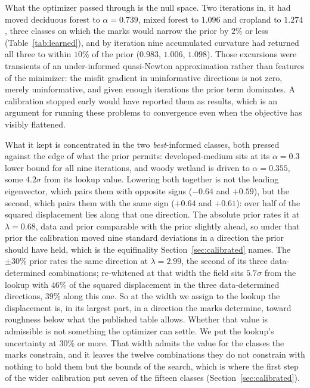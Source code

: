 \documentclass[11pt]{article}
\begin{document}
What the optimizer passed through is the null space. Two iterations
in, it had moved deciduous forest to $\alpha = 0.739$, mixed forest to
$1.096$ and cropland to $1.274$, three classes on which the marks
would narrow the prior by $2\%$ or less (Table~\ref{tab:learned}), and by
iteration nine accumulated curvature had returned all three to within
$10\%$ of the prior ($0.983$, $1.006$, $1.098$). Those excursions
were transients of an under-informed
quasi-Newton approximation rather than features of the minimizer: the
misfit gradient in uninformative directions is not zero, merely
uninformative, and given enough iterations the prior term dominates. A
calibration stopped early would have reported them as results, which is
an argument for running these problems to convergence even when the
objective has visibly flattened.

What it kept is concentrated in the two \emph{best}-informed classes,
both pressed against the edge of what the prior permits:
developed-medium sits at its $\alpha = 0.3$ lower bound for all nine
iterations, and woody wetland is driven to $\alpha = 0.355$, some
$4.2\sigma$ from its lookup value. Lowering both together is not the
leading eigenvector, which pairs them with opposite signs ($-0.64$ and
$+0.59$), but the second, which pairs them with the same sign ($+0.64$
and $+0.61$): over half of the squared displacement lies along that one
direction. The absolute prior rates it at $\lambda = 0.68$, data and
prior comparable with the prior slightly ahead, so under that prior
the calibration moved nine standard deviations in a direction the
prior should have held, which is the equifinality
Section~\ref{sec:calibrated} names. The $\pm 30\%$ prior rates the same
direction at $\lambda = 2.99$, the second of its three data-determined
combinations; re-whitened at that width the field sits $5.7\sigma$
from the lookup with $46\%$ of the squared displacement in the three
data-determined directions, $39\%$ along this one. So at the width we
assign to the lookup the displacement is, in its largest part, in a
direction the marks determine, toward roughness below what the
published table allows. Whether that value is admissible is not
something the optimizer can settle. We put the lookup's uncertainty at $30\%$ or
more. That width admits the value for the classes the marks constrain,
and it leaves the twelve combinations they do not constrain with
nothing to hold them but the bounds of the search, which is where the
first step of the wider calibration put seven of the fifteen classes
(Section~\ref{sec:calibrated}).
\end{document}
